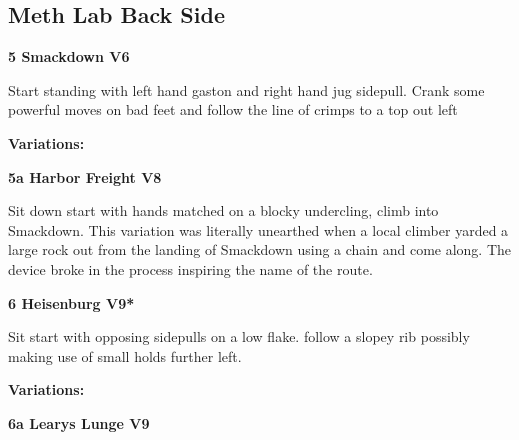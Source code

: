 	\begin{multicols}{2}


\needspace{1.5cm}
\subsection*{Meth Lab Back Side}\label{bf:Meth Lab Back Side}
	


\needspace{1.5cm}
\label{rt:Smackdown}
\colorbox{RoyalBlue!20}{
\parbox{0.95\linewidth}{
\textbf{
5 Smackdown V6  
}}}

\begin{adjustwidth}{0.5cm}{}			
Start standing with left hand gaston and right hand jug sidepull. Crank some powerful moves on bad feet and follow the line of crimps to a top out left
\end{adjustwidth}

\begin{adjustwidth}{0.5cm}{}				
\needspace{3cm}
\textbf{Variations:} \newline

\needspace{1.5cm}
\label{vr:Harbor Freight}
\colorbox{Goldenrod!50}{
\parbox{0.95\linewidth}{
\textbf{
5a Harbor Freight V8  
}}}

\begin{adjustwidth}{0.5cm}{}			
Sit down start with hands matched on a blocky undercling, climb into Smackdown. This variation was literally unearthed when a local climber yarded a large rock out from the landing of Smackdown using a chain and come along. The device broke in the process inspiring the name of the route.
\end{adjustwidth}


\end{adjustwidth}


\needspace{1.5cm}
\label{rt:Heisenburg}
\colorbox{Goldenrod!50}{
\parbox{0.95\linewidth}{
\textbf{
6 Heisenburg V9*  
}}}

\begin{adjustwidth}{0.5cm}{}			
Sit start with opposing sidepulls on a low flake. follow a slopey rib possibly making use of small holds further left.
\end{adjustwidth}

\begin{adjustwidth}{0.5cm}{}				
\needspace{3cm}
\textbf{Variations:} \newline

\needspace{1.5cm}
\label{vr:Learys Lunge}
\colorbox{Goldenrod!50}{
\parbox{0.95\linewidth}{
\textbf{
6a Learys Lunge V9  
}}}


\end{adjustwidth}
\end{multicols}
